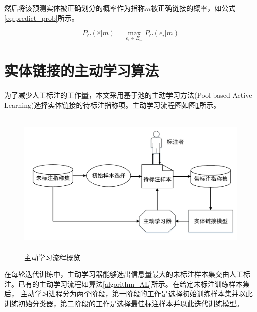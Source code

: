 然后将该预测实体被正确划分的概率作为指称$m$被正确链接的概率，如公式\ref{eq:predict_prob}所示。

\begin{equation}\label{eq:predict_prob}
P_C(\hat{e}|m)=\max_{e_i\in E_m}P_C(e_i|m)
\end{equation}

\section{实体链接的主动学习算法}
为了减少人工标注的工作量，本文采用基于池的主动学习方法(Pool-based Active Learning)选择实体链接的待标注指称项。主动学习流程图如图\ref{fig:al_overview}所示。

\begin{figure}[!htb]
	\centering\includegraphics[height=7cm]{resource/al_overview}
	\caption{主动学习流程概览}
	\label{fig:al_overview}
\end{figure}

在每轮迭代训练中，主动学习器能够选出信息量最大的未标注样本集交由人工标注。已有的主动学习\cite{settles2012active}流程如算法\ref{algorithm_AL}所示。在给定未标注训练样本集后， 主动学习进程分为两个阶段，第一阶段的工作是选择初始训练样本集并以此训练初始分类器，第二阶段的工作是选择最佳标注样本并以此迭代训练模型。


